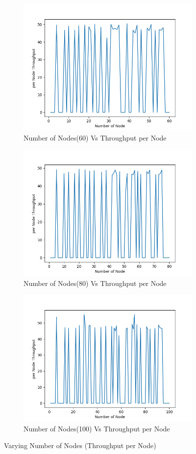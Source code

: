 \begin{figure}[h]
\begin{subfigure}{.5\textwidth}
    \includegraphics[width=.8\linewidth]{_11_2_mobile/NumberofNode(60)vsperNodeThroughput.png}
         \caption{Number of Nodes(60) Vs Throughput per Node}
        \end{subfigure}
\begin{subfigure}{.5\textwidth}
    \centering
    \includegraphics[width=.8\linewidth]{_11_2_mobile/NumberofNode(80)vsperNodeThroughput.png}
         \caption{Number of Nodes(80) Vs Throughput per Node}
        \end{subfigure}
\begin{subfigure}{.5\textwidth}
    \centering
    \includegraphics[width=.8\linewidth]{_11_2_mobile/NumberofNode(100)vsperNodeThroughput.png}
         \caption{Number of Nodes(100) Vs Throughput per Node}
        \end{subfigure}
\caption{Varying Number of Nodes (Throughput per Node)}
\label{node_per_node_throughput_mobile}
\end{figure}
